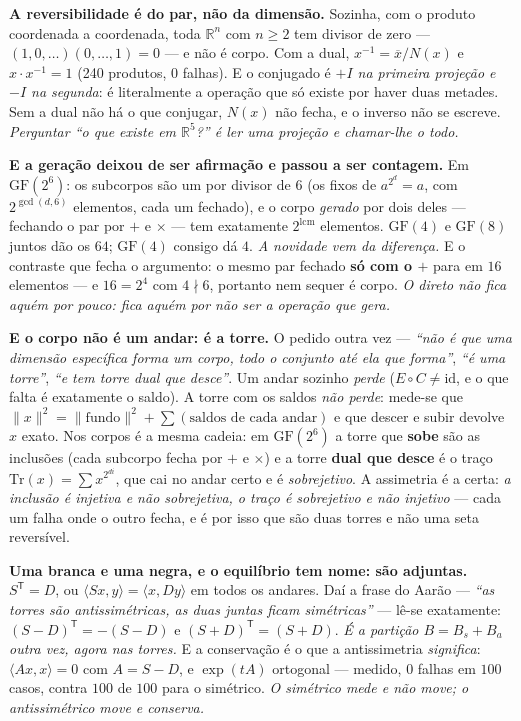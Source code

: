 \documentclass[11pt]{article}
\newcommand{\R}{\mathbb R}
\theoremstyle{plain}
\theoremstyle{remark}
\begin{document}
\begin{itemize}
\textbf{A reversibilidade é do par, não da dimensão.} Sozinha, com o produto coordenada a
coordenada, toda $\R^n$ com $n\ge2$ tem divisor de zero --- $(1,0,\dots)(0,\dots,1)=0$ --- e não é
corpo. Com a dual, $x^{-1}=\overline{x}/N(x)$ e $x\cdot x^{-1}=1$ (240 produtos, 0 falhas). E o
conjugado é \emph{$+I$ na primeira projeção e $-I$ na segunda}: é literalmente a operação que só
existe por haver duas metades. Sem a dual não há o que conjugar, $N(x)$ não fecha, e o inverso não
se escreve. \emph{Perguntar ``o que existe em $\R^5$?'' é ler uma projeção e chamar-lhe o todo.}

\textbf{E a geração deixou de ser afirmação e passou a ser contagem.} Em $\mathrm{GF}(2^6)$: os
subcorpos são um por divisor de $6$ (os fixos de $a^{2^d}=a$, com $2^{\gcd(d,6)}$ elementos, cada
um fechado), e o corpo \emph{gerado} por dois deles --- fechando o par por $+$ e $\times$ --- tem
exatamente $2^{\mathrm{lcm}}$ elementos. $\mathrm{GF}(4)$ e $\mathrm{GF}(8)$ juntos dão os $64$;
$\mathrm{GF}(4)$ consigo dá $4$. \emph{A novidade vem da diferença.} E o contraste que fecha o
argumento: o mesmo par fechado \textbf{só com o $+$} para em $16$ elementos --- e $16=2^4$ com
$4\nmid6$, portanto nem sequer é corpo. \emph{O direto não fica aquém por pouco: fica aquém por
não ser a operação que gera.}

\textbf{E o corpo não é um andar: é a torre.} O pedido outra vez --- \emph{``não é que uma dimensão
específica forma um corpo, todo o conjunto até ela que forma''}, \emph{``é uma torre''}, \emph{``e
tem torre dual que desce''}. Um andar sozinho \emph{perde} ($E\!\circ\!C\ne\mathrm{id}$, e o que
falta é exatamente o saldo). A torre com os saldos \emph{não perde}: mede-se que $\|x\|^2 =
\|\text{fundo}\|^2 + \sum(\text{saldos de cada andar})$ e que descer e subir devolve $x$ exato. Nos
corpos é a mesma cadeia: em $\mathrm{GF}(2^6)$ a torre que \textbf{sobe} são as inclusões (cada
subcorpo fecha por $+$ e $\times$) e a torre \textbf{dual que desce} é o traço $\mathrm{Tr}(x)=\sum
x^{2^{di}}$, que cai no andar certo e é \emph{sobrejetivo}. A assimetria é a certa: \emph{a
inclusão é injetiva e não sobrejetiva, o traço é sobrejetivo e não injetivo} --- cada um falha onde
o outro fecha, e é por isso que são duas torres e não uma seta reversível.

\textbf{Uma branca e uma negra, e o equilíbrio tem nome: são adjuntas.} $S^{\mathsf T}=D$, ou
$\langle Sx,y\rangle=\langle x,Dy\rangle$ em todos os andares. Daí a frase do Aarão --- \emph{``as
torres são antissimétricas, as duas juntas ficam simétricas''} --- lê-se exatamente:
$(S-D)^{\mathsf T}=-(S-D)$ e $(S+D)^{\mathsf T}=(S+D)$. \emph{É a partição $B=B_s+B_a$ outra vez, agora
nas torres.} E a conservação é o que a antissimetria \emph{significa}: $\langle Ax,x\rangle=0$ com
$A=S-D$, e $\exp(tA)$ ortogonal --- medido, $0$ falhas em $100$ casos, contra $100$ de $100$ para o
simétrico. \emph{O simétrico mede e não move; o antissimétrico move e conserva.}


\end{itemize}
\end{document}

